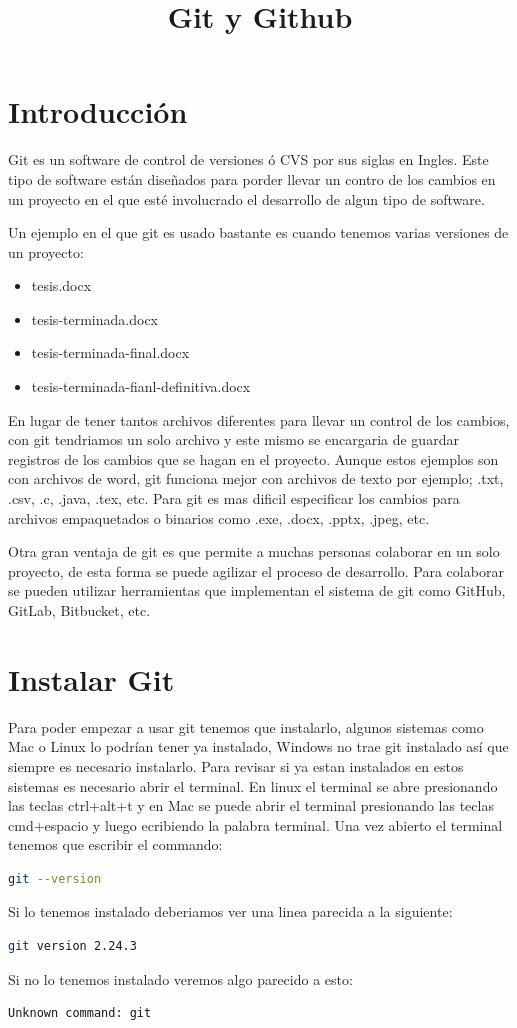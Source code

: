\documentclass[11pt, oneside]{article}
\title{Git y Github}
\date{}
\begin{document}
\maketitle

\section{Introducción}
Git es un software de control de versiones ó CVS por sus siglas en Ingles. Este tipo de software están diseñados para porder llevar un contro de los cambios en un proyecto en el que esté involucrado el desarrollo de algun tipo de software.

Un ejemplo en el que git es usado bastante es cuando tenemos varias versiones de un proyecto:
\begin{itemize}
  \item tesis.docx
  \item tesis-terminada.docx
  \item tesis-terminada-final.docx
  \item tesis-terminada-fianl-definitiva.docx
\end{itemize}
En lugar de tener tantos archivos diferentes para llevar un control de los cambios, con git tendriamos un solo archivo y este mismo se encargaria de guardar registros de los cambios que se hagan en el proyecto. Aunque estos ejemplos son con archivos de word, git funciona mejor con archivos de texto por ejemplo; .txt, .csv, .c, .java, .tex, etc. Para git es mas dificil especificar los cambios para archivos empaquetados o binarios como .exe, .docx, .pptx, .jpeg, etc.

Otra gran ventaja de git es que permite a muchas personas colaborar en un solo proyecto, de esta forma se puede agilizar el proceso de desarrollo. Para colaborar se pueden utilizar herramientas que implementan el sistema de git como GitHub, GitLab, Bitbucket, etc.

\section{Instalar Git}
Para poder empezar a usar git tenemos que instalarlo, algunos sistemas como Mac o Linux lo podrían tener ya instalado, Windows no trae git instalado así que siempre es necesario instalarlo. Para revisar si ya estan instalados en estos sistemas es necesario abrir el terminal. En linux el terminal se abre presionando las teclas ctrl+alt+t y en Mac se puede abrir el terminal presionando las teclas cmd+espacio y luego ecribiendo la palabra terminal. Una vez abierto el terminal tenemos que escribir el commando:
\begin{lstlisting}[language=bash,caption={Comando para revisar versión de Git}]
git --version
\end{lstlisting}
Si lo tenemos instalado deberiamos ver una linea parecida a la siguiente:
\begin{lstlisting}[language=bash,caption={Versión de Git}]
git version 2.24.3 
\end{lstlisting}
Si no lo tenemos instalado veremos algo parecido a esto:
\begin{lstlisting}[language=bash,caption={Git no instalado}]
Unknown command: git
\end{lstlisting}
\end{document}
